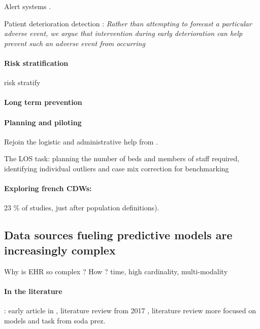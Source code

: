 \documentclass[french,12pt,twoside,a4paper]{book}
\begin{document}
Alert systems \citep{yu2018artificial}.

Patient deterioration detection \citep{rothman2013development}: \textit{Rather than attempting to forecast a particular
  adverse event, we argue that intervention during early deterioration can help prevent such an adverse event from
  occurring}

\paragraph{Risk stratification}

risk stratify \citep{tang2007global}

\paragraph{Long term prevention}


\paragraph{Planning and piloting}

Rejoin the logistic and administrative help from \cite{topol2019high}.

The LOS task: planning the number of beds and members of staff required,
identifying individual outliers and case mix correction for benchmarking \citep{verburg2017models}

\paragraph{Exploring french CDWs:} 23 \% of studies, just after population definitions).

\subsection{Data sources fueling predictive models are increasingly complex}\label{subsec:predictive_models:complex_data}

Why is EHR so complex ? How ? time, high cardinality, multi-modality

\paragraph{In the literature}: early article in \cite{wu2010prediction},
literature review from 2017 \citep{goldstein2017opportunities}, literature
review more focused on models and task from soda prez.
\end{document}
